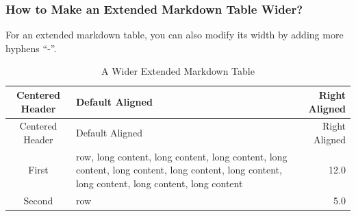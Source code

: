 \documentclass[10pt, a4paper, oneside]{article}
\begin{document}
\subsubsection{How to Make an Extended Markdown Table Wider?}\label{how-to-make-an-extended-markdown-table-wider}

For an extended markdown table, you can also modify its width by adding more hyphens ``-''.

\begin{longtable}[c]{@{}clr@{}}
\caption{A Wider Extended Markdown Table \label{wem-table}}\tabularnewline
\toprule
\begin{minipage}[b]{0.27\columnwidth}\centering\strut
Centered
Header
\strut\end{minipage} & \begin{minipage}[b]{0.41\columnwidth}\raggedright\strut
Default
Aligned
\strut\end{minipage} & \begin{minipage}[b]{0.19\columnwidth}\raggedleft\strut
Right
Aligned
\strut\end{minipage}\tabularnewline
\midrule
\endfirsthead
\toprule
\begin{minipage}[b]{0.27\columnwidth}\centering\strut
Centered
Header
\strut\end{minipage} & \begin{minipage}[b]{0.41\columnwidth}\raggedright\strut
Default
Aligned
\strut\end{minipage} & \begin{minipage}[b]{0.19\columnwidth}\raggedleft\strut
Right
Aligned
\strut\end{minipage}\tabularnewline
\midrule
\endhead
\begin{minipage}[t]{0.27\columnwidth}\centering\strut
First
\strut\end{minipage} & \begin{minipage}[t]{0.41\columnwidth}\raggedright\strut
row,
long content,
long content,
long content,
long content,
long content,
long content,
long content,
long content,
long content,
long content
\strut\end{minipage} & \begin{minipage}[t]{0.19\columnwidth}\raggedleft\strut
12.0
\strut\end{minipage}\tabularnewline
\begin{minipage}[t]{0.27\columnwidth}\centering\strut
Second
\strut\end{minipage} & \begin{minipage}[t]{0.41\columnwidth}\raggedright\strut
row
\strut\end{minipage} & \begin{minipage}[t]{0.19\columnwidth}\raggedleft\strut
5.0
\strut\end{minipage}\tabularnewline
\bottomrule
\end{longtable}
\end{document}
